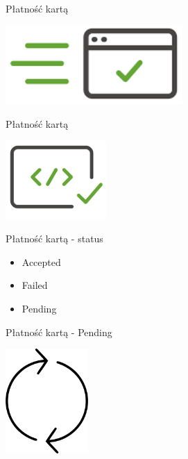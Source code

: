 \documentclass{beamer}
\begin{document}
\begin{frame}{Płatność kartą}
	\begin{center}
  		\includegraphics[height=3cm]{request4.png}
	\end{center}
\end{frame}

\begin{frame}{Płatność kartą}
	\begin{center}
		\includegraphics[height=3cm]{response1.png}
	\end{center}
\end{frame}

\begin{frame}{Płatność kartą - status}
	\begin{huge}
		\begin{itemize}[<+->]
			\item Accepted
			\item Failed
			\item Pending
		\end{itemize}
	\end{huge}
\end{frame}

\begin{frame}{Płatność kartą - Pending}
	\begin{center}
		\includegraphics[height=4cm]{cykl1.png}
	\end{center}
\end{frame}
\end{document}
